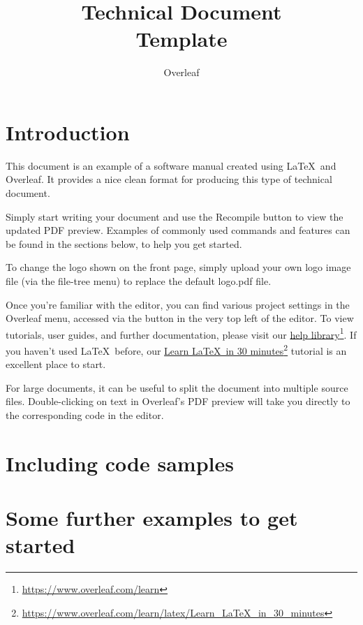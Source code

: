 \documentclass{ol-softwaremanual}
\title{Technical Document \\Template}
\author{Overleaf}
\newcommand{\doclink}[2]{\href{#1}{#2}\footnote{\url{#1}}}
\begin{document}
\maketitle

\tableofcontents
\newpage

\section{Introduction}

This document is an example of a software manual created using \LaTeX\ and Overleaf. It provides a nice clean format for producing this type of technical document. 

Simply start writing your document and use the Recompile button to view the updated PDF preview. Examples of commonly used commands and features can be found in the sections below, to help you get started.

To change the logo shown on the front page, simply upload your own logo image file (via the file-tree menu) to replace the default logo.pdf file. 

Once you're familiar with the editor, you can find various project settings in the Overleaf menu, accessed via the button in the very top left of the editor. To view tutorials, user guides, and further documentation, please visit our \doclink{https://www.overleaf.com/learn}{help library}. If you haven't used \LaTeX\ before, our \doclink{https://www.overleaf.com/learn/latex/Learn_LaTeX_in_30_minutes}{Learn \LaTeX\ in 30 minutes} tutorial is an excellent place to start.

For large documents, it can be useful to split the document into multiple source files.
Double-clicking on text in Overleaf's PDF preview will take you directly to the corresponding code in the editor.

\section{Including code samples}



\section{Some further examples to get started}


\end{document}
